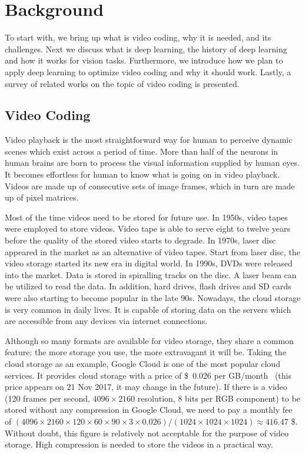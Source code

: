 \chapter{Background}\label{ch:chapter2} %
%
%
To start with, we bring up what is video coding, why it is needed, and
its challenges.
Next we discuss what is deep learning, the history of deep learning and how
it works for vision tasks.
Furthermore, we introduce how we plan to apply deep learning to optimize video
coding and why it should work.
Lastly, a survey of related works on the topic of video coding is presented.

%
\section{Video Coding}\label{sec:video-coding}
Video playback is the most straightforward way for human to perceive dynamic
scenes which exist across a period of time.
More than half of the neurons in human brains are born to process the visual
information supplied by human eyes.
It becomes effortless for human to know what is going on in
video playback.
Videos are made up of consecutive sets of image frames, which in turn
are made up of pixel matrices.

Most of the time videos need to be stored for future use.
In 1950s, video tapes were employed to store videos.
Video tape is able to serve eight to twelve years
before the quality of the stored video starts to degrade.
In 1970s, laser disc appeared in the market as an alternative of video tapes.
Start from laser disc, the video storage started its new era in digital world.
In 1990s, DVDs were released into the market.
Data is stored in spiralling tracks on the disc.
A laser beam can be utilized to read the data.
In addition, hard drives, flash drives and SD cards were also starting to
become popular in the late 90s.
Nowadays, the cloud storage is very common in daily lives.
It is capable of storing data on the servers which are
accessible from any devices via internet connections.

Although so many formats are available for video storage, they share a common
feature: the more storage you use, the more extravagant it will be.
Taking the cloud storage as an example,
Google Cloud is one of the most popular cloud services.
It provides cloud storage with a price
of \SI{0.026}[\$]{} per GB/month~\parencite{RN202}
(this price appears on 21 Nov 2017, it may change in the future).
If there is a video 
(120 frames per second, 
\(4096\times2160\) resolution, 
8 bits per RGB component)
to be stored without
any compression in Google Cloud,
we need to pay a monthly fee of
\((4096\times2160\times120\times60\times90\times3\times0.026)/(1024\times1024\times1024) \approx 416.47\) \$.
Without doubt, this figure is relatively not acceptable for the purpose of
video storage.
High compression is needed to store the videos in a practical way.

